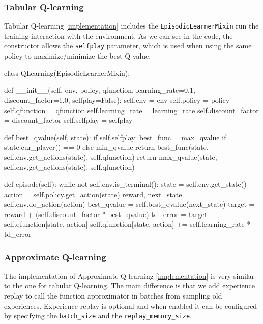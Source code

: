 \documentclass{article}
\newcommand{\GithubURL}[1]{[\href{https://github.com/davidrobles/mlnd-capstone-code/blob/master/#1}{implementation}]}
\begin{document}
\subsubsection{Tabular Q-learning}

Tabular Q-learning \GithubURL{capstone/rl/learners/qlearning.py} includes the
\texttt{EpisodicLearnerMixin} run the training interaction with the environment. As we can see in
the code, the constructor allows the \texttt{selfplay} parameter, which is used when using the same
policy to maximize/minimize the best Q-value.

\begin{python}
class QLearning(EpisodicLearnerMixin):

    def __init__(self, env, policy, qfunction, learning_rate=0.1,
                 discount_factor=1.0, selfplay=False):
        self.env = env
        self.policy = policy
        self.qfunction = qfunction
        self.learning_rate = learning_rate
        self.discount_factor = discount_factor
        self.selfplay = selfplay

    def best_qvalue(self, state):
        if self.selfplay:
            best_func = max_qvalue if state.cur_player() == 0 else min_qvalue
            return best_func(state, self.env.get_actions(state), self.qfunction)
        return max_qvalue(state, self.env.get_actions(state), self.qfunction)

    def episode(self):
        while not self.env.is_terminal():
            state = self.env.get_state()
            action = self.policy.get_action(state)
            reward, next_state = self.env.do_action(action)
            best_qvalue = self.best_qvalue(next_state)
            target = reward + (self.discount_factor * best_qvalue)
            td_error = target - self.qfunction[state, action]
            self.qfunction[state, action] += self.learning_rate * td_error
\end{python}

\subsubsection{Approximate Q-learning}

The implementation of Approximate Q-learning \GithubURL{capstone/rl/learners/qlearning_approx.py} is
very similar to the one for tabular Q-learning. The main difference is that we add experience replay
to call the function approximator in batches from sampling old experiences. Experience replay is
optional and when enabled it can be configured by specifying the \texttt{batch\_size} and the
\texttt{replay\_memory\_size}.
\end{document}
